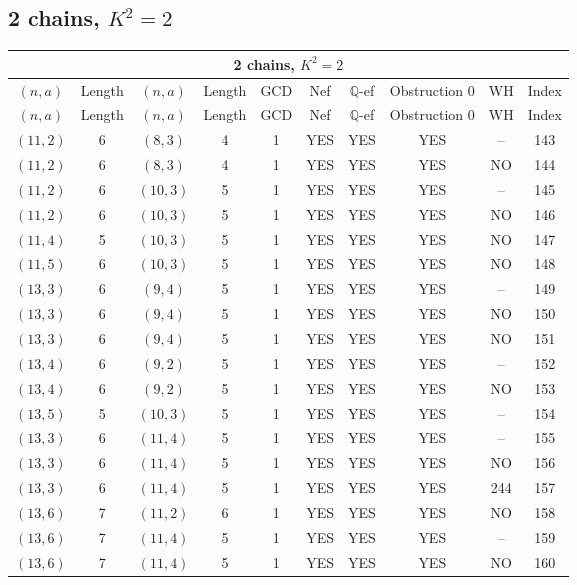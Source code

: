 \subsection{2 chains, $K^2 = 2$}
\begin{longtable}{|c|c|c|c|c|c|c|c|c|c|}
\hline
\multicolumn{10}{|c|}{2 chains, $K^2 = 2$}\\
\hline
$(n,a)$ & Length & $(n,a)$ & Length & GCD & Nef & $\mathbb Q$-ef & Obstruction 0 & WH & Index\\
\hline
\endfirsthead

\hline
$(n,a)$ & Length & $(n,a)$ & Length & GCD & Nef & $\mathbb Q$-ef & Obstruction 0 & WH & Index\\
\hline
\endhead
\hline
\endfoot

$(11, 2)$ & 6 & $(8, 3)$ & 4 & 1 & YES & YES & YES & -- & 143\\
$(11, 2)$ & 6 & $(8, 3)$ & 4 & 1 & YES & YES & YES & NO & 144\\
$(11, 2)$ & 6 & $(10, 3)$ & 5 & 1 & YES & YES & YES & -- & 145\\
$(11, 2)$ & 6 & $(10, 3)$ & 5 & 1 & YES & YES & YES & NO & 146\\
$(11, 4)$ & 5 & $(10, 3)$ & 5 & 1 & YES & YES & YES & NO & 147\\
$(11, 5)$ & 6 & $(10, 3)$ & 5 & 1 & YES & YES & YES & NO & 148\\
$(13, 3)$ & 6 & $(9, 4)$ & 5 & 1 & YES & YES & YES & -- & 149\\
$(13, 3)$ & 6 & $(9, 4)$ & 5 & 1 & YES & YES & YES & NO & 150\\
$(13, 3)$ & 6 & $(9, 4)$ & 5 & 1 & YES & YES & YES & NO & 151\\
$(13, 4)$ & 6 & $(9, 2)$ & 5 & 1 & YES & YES & YES & -- & 152\\
$(13, 4)$ & 6 & $(9, 2)$ & 5 & 1 & YES & YES & YES & NO & 153\\
$(13, 5)$ & 5 & $(10, 3)$ & 5 & 1 & YES & YES & YES & -- & 154\\
$(13, 3)$ & 6 & $(11, 4)$ & 5 & 1 & YES & YES & YES & -- & 155\\
$(13, 3)$ & 6 & $(11, 4)$ & 5 & 1 & YES & YES & YES & NO & 156\\
$(13, 3)$ & 6 & $(11, 4)$ & 5 & 1 & YES & YES & YES & 244 & 157\\
$(13, 6)$ & 7 & $(11, 2)$ & 6 & 1 & YES & YES & YES & NO & 158\\
$(13, 6)$ & 7 & $(11, 4)$ & 5 & 1 & YES & YES & YES & -- & 159\\
$(13, 6)$ & 7 & $(11, 4)$ & 5 & 1 & YES & YES & YES & NO & 160\\

\end{longtable}
